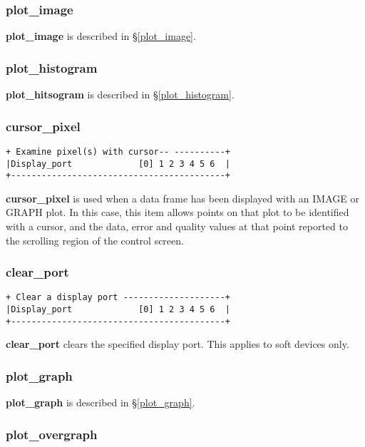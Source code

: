 {\subsubsection{plot\_image}

{\bf plot\_image} is described in \S \ref{plot_image}.

\subsubsection{plot\_histogram}

{\bf plot\_hitsogram} is described in \S \ref{plot_histogram}.

\subsubsection{cursor\_pixel}
\begin{verbatim}
+ Examine pixel(s) with cursor-- ----------+
|Display_port             [0] 1 2 3 4 5 6  |
+------------------------------------------+
\end{verbatim}

{\bf cursor\_pixel} is used when a data frame has been displayed with 
an IMAGE or GRAPH plot. In this case, this item allows points on that plot 
to be identified with a cursor, and the data, error and quality values at 
that point reported to the scrolling region of the control screen.

\subsubsection{clear\_port}
\begin{verbatim}
+ Clear a display port --------------------+
|Display_port             [0] 1 2 3 4 5 6  |
+------------------------------------------+
\end{verbatim}

{\bf clear\_port} clears the specified display port. This applies to
soft devices only.

\subsubsection{plot\_graph}

{\bf plot\_graph} is described in \S \ref{plot_graph}.

\subsubsection{plot\_overgraph}

}
